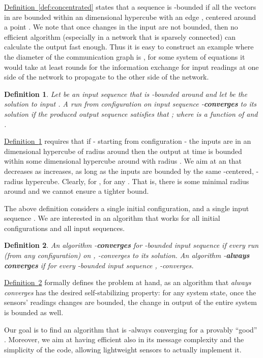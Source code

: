 \documentclass[preprint,12pt]{elsarticle}
\newtheorem{definition}{Definition}
\newcommand{\namedref}[2]{\hyperref[#2]{#1~\ref*{#2}}}
\newcommand{\definitionref}[1]{\namedref{Definition}{#1}}
\begin{document}
\definitionref{def:concentrated} states that a sequence  is -bounded if all
the vectors in 
are bounded within an  dimensional hypercube with an edge , centered around a point . We note that once changes
in the input are not bounded, then no efficient algorithm
(especially in a network that is sparsely connected) can calculate
the output fast enough. Thus it is easy to construct an example where the diameter of the
communication graph is , for some system of equations it would
take at least  rounds for the information exchange for input readings at
one side of the network to propagate to the other side of the
network.

\begin{definition}\label{def:runconverges}
  Let  be an input sequence that is -bounded
  around  and let  be the solution to input .
  A run from configuration  on input sequence  -{\bf converges} to its solution if
  the produced output sequence  satisfies that
  ; where 
  is a function of  and .
\end{definition}

\definitionref{def:runconverges} requires that if - starting from
configuration  - the inputs are in an  dimensional hypercube of
radius  around  then the output at time  is
bounded within some  dimensional hypercube around  with
radius . We aim at an
 that decreases as 
increases, as long as the inputs are bounded by the same
-centered, -radius hypercube. Clearly, for ,  for any . That is, there
is some minimal radius  around  and we cannot
ensure a tighter bound.

The above definition considers a single initial configuration, and
a single input sequence . We are interested in an
algorithm that works for all initial configurations and all input
sequences.

\begin{definition}\label{def:alwaysconv}
  An algorithm  -{\bf converges} for -bounded input sequence  if every run (from any configuration) on
  ,
  -converges to its solution.  An algorithm  -{\bf always converges} if for
  every -bounded input sequence ,  -converges.
\end{definition}

\definitionref{def:alwaysconv} formally defines the problem at
hand, as an algorithm  that {\em always converges} has the
desired self-stabilizing property: for any system state, once the
sensors' readings changes are bounded, the change in output of the
entire system is bounded as well.

Our goal is to find an algorithm  that is -always
converging for a provably ``good'' . Moreover, we aim at
having  efficient also in its message complexity and
the simplicity of the code, allowing lightweight sensors to actually
implement it.
\end{document}
